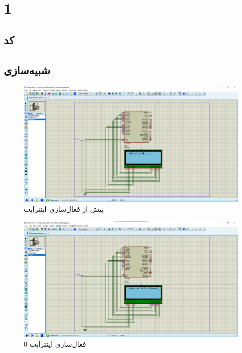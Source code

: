 \documentclass{article}
\begin{document}


\tableofcontents
\newpage

\section{1}


\subsection{کد}
\lr{}

\subsection{شبیه‌سازی}
\begin{figure}[H]
    \centering
    \includegraphics[width=1\textwidth]{figures/1.png}
    \caption
	{
پیش از فعال‌سازی اینتراپت
	}
    \label{fig:fig1}
\end{figure}
\begin{figure}[H]
    \centering
    \includegraphics[width=1\textwidth]{figures/2.png}
    \caption
	{
فعال‌سازی اینتراپت 0
	}
    \label{fig:fig1}
\end{figure}
\end{document}
